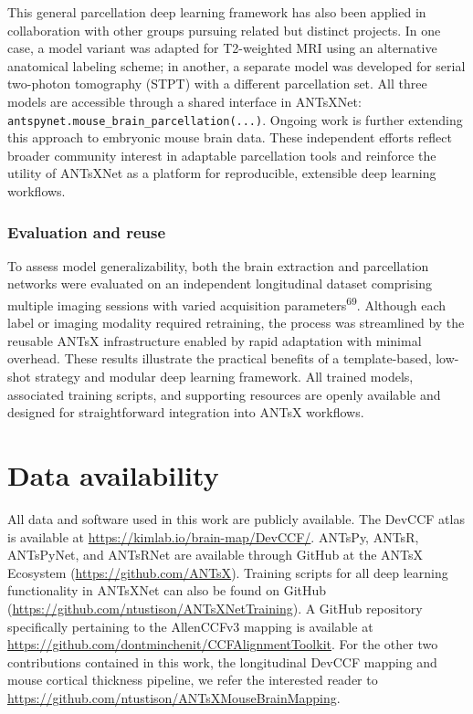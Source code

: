 \documentclass[
  12pt,
]{article}
\begin{document}
This general parcellation deep learning framework has also been applied
in collaboration with other groups pursuing related but distinct
projects. In one case, a model variant was adapted for T2-weighted MRI
using an alternative anatomical labeling scheme; in another, a separate
model was developed for serial two-photon tomography (STPT) with a
different parcellation set. All three models are accessible through a
shared interface in ANTsXNet:
\texttt{antspynet.mouse\_brain\_parcellation(...)}. Ongoing work is
further extending this approach to embryonic mouse brain data. These
independent efforts reflect broader community interest in adaptable
parcellation tools and reinforce the utility of ANTsXNet as a platform
for reproducible, extensible deep learning workflows.

\subsubsection{Evaluation and reuse}\label{evaluation-and-reuse}

To assess model generalizability, both the brain extraction and
parcellation networks were evaluated on an independent longitudinal
dataset comprising multiple imaging sessions with varied acquisition
parameters\textsuperscript{69}. Although each label or imaging modality
required retraining, the process was streamlined by the reusable ANTsX
infrastructure enabled by rapid adaptation with minimal overhead. These
results illustrate the practical benefits of a template-based, low-shot
strategy and modular deep learning framework. All trained models,
associated training scripts, and supporting resources are openly
available and designed for straightforward integration into ANTsX
workflows.

\clearpage

\section*{Data availability}\label{data-availability}

All data and software used in this work are publicly available. The
DevCCF atlas is available at \url{https://kimlab.io/brain-map/DevCCF/}.
ANTsPy, ANTsR, ANTsPyNet, and ANTsRNet are available through GitHub at
the ANTsX Ecosystem (\url{https://github.com/ANTsX}). Training scripts
for all deep learning functionality in ANTsXNet can also be found on
GitHub (\url{https://github.com/ntustison/ANTsXNetTraining}). A GitHub
repository specifically pertaining to the AllenCCFv3 mapping is
available at \url{https://github.com/dontminchenit/CCFAlignmentToolkit}.
For the other two contributions contained in this work, the longitudinal
DevCCF mapping and mouse cortical thickness pipeline, we refer the
interested reader to
\url{https://github.com/ntustison/ANTsXMouseBrainMapping}.
\end{document}
